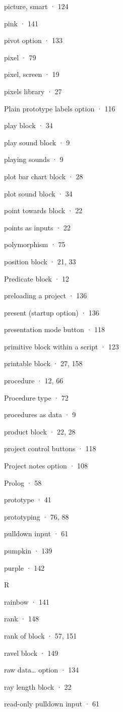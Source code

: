 \documentclass[
  letterpaper,
]{book}
\begin{document}
picture, smart · 124

pink · 141

pivot option · 133

pixel · 79

pixel, screen · 19

pixels library · 27

Plain prototype labels option · 116

play block · 34

play sound block · 9

playing sounds · 9

plot bar chart block · 28

plot sound block · 34

point towards block · 22

points as inputs · 22

polymorphism · 75

position block · 21, 33

Predicate block · 12

preloading a project · 136

present (startup option) · 136

presentation mode button · 118

primitive block within a script · 123

printable block · 27, 158

procedure · 12, 66

Procedure type · 72

procedures as data · 9

product block · 22, 28

project control buttons · 118

Project notes option · 108

Prolog · 58

prototype · 41

prototyping · 76, 88

pulldown input · 61

pumpkin · 139

purple · 142

R

rainbow · 141

rank · 148

rank of block · 57, 151

ravel block · 149

raw data\ldots{} option · 134

ray length block · 22

read-only pulldown input · 61
\end{document}
